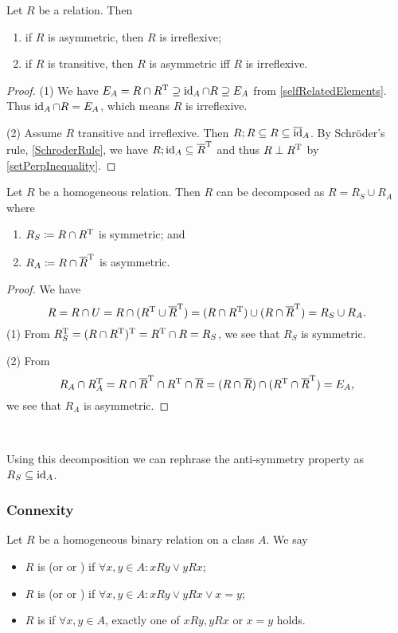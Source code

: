 \begin{lemma} \label{asymmetricIrreflexive}
Let $R$ be a relation. Then
\begin{enumerate}
\item if $R$ is asymmetric, then $R$ is irreflexive;
\item if $R$ is transitive, then $R$ is asymmetric iff $R$ is irreflexive.
\end{enumerate}
\end{lemma}
\begin{proof}
(1) We have $E_A = R \cap R^{\mathrm{T}} \supseteq \operatorname{id}_A\cap R \supseteq E_A$ from \ref{selfRelatedElements}. Thus $\operatorname{id}_A\cap R = E_A$, which means $R$ is irreflexive.

(2) Assume $R$ transitive and irreflexive. Then $R;R \subseteq R \subseteq \overline{\operatorname{id}}_A$. By Schröder's rule, \ref{SchroderRule}, we have $R;\operatorname{id}_A \subseteq \overline{R}^{\mathrm{T}}$ and thus $R\perp R^{\mathrm{T}}$ by \ref{setPerpInequality}.
\end{proof}

\begin{proposition} \label{symmetricAsymmetricDecomposition}
Let $R$ be a homogeneous relation. Then $R$ can be decomposed as $R = R_S \cup R_A$ where
\begin{enumerate}
\item $R_S \coloneqq R \cap R^{\mathrm{T}}$ is symmetric; and
\item $R_A \coloneqq R \cap \overline{R}^{\mathrm{T}}$ is asymmetric.
\end{enumerate}
\end{proposition}
\begin{proof}
We have
\[ R = R\cap U = R\cap (R^{\mathrm{T}} \cup \overline{R}^{\mathrm{T}}) = (R \cap R^{\mathrm{T}}) \cup (R \cap \overline{R}^{\mathrm{T}}) = R_S \cup R_A. \]
(1) From $R_S^{\mathrm{T}} = (R \cap R^{\mathrm{T}})^{\mathrm{T}} = R^{\mathrm{T}} \cap R = R_S$, we see that $R_S$ is symmetric.

(2) From
\[ R_A \cap R_A^{\mathrm{T}} = R \cap \overline{R}^{\mathrm{T}} \cap R^{\mathrm{T}} \cap \overline{R} = (R \cap \overline{R}) \cap (R^{\mathrm{T}} \cap \overline{R}^{\mathrm{T}}) = E_A, \]
we see that $R_A$ is asymmetric.
\end{proof}\

Using this decomposition we can rephrase the anti-symmetry property as $R_S \subseteq \operatorname{id}_A$.

\subsubsection{Connexity}
\begin{definition}
Let $R$ be a homogeneous binary relation on a class $A$. We say
\begin{itemize}
\item $R$ is  (or  or ) if $\forall x,y\in A: xRy \lor yRx$;
\item $R$ is  (or  or ) if $\forall x,y\in A: xRy \lor yRx \lor x=y$;
\item $R$ is  if $\forall x,y\in A$, exactly one of $xRy, yRx$ or $x=y$ holds.
\end{itemize}
\end{definition}

